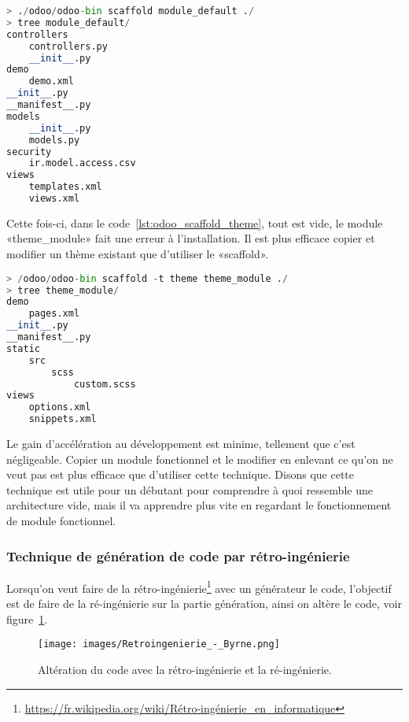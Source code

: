 \begin{lstlisting}[language=Python, upquote=true, caption={Commande Odoo pour générer un module avec le Scaffold}, label={lst:odoo_scaffold_default}]
> ./odoo/odoo-bin scaffold module_default ./
> tree module_default/
controllers
    controllers.py
    __init__.py
demo
    demo.xml
__init__.py
__manifest__.py
models
    __init__.py
    models.py
security
    ir.model.access.csv
views
    templates.xml
	views.xml
\end{lstlisting}

Cette fois-ci, dans le code~\ref{lst:odoo_scaffold_theme}, tout est vide, le module «theme\_module» fait une erreur à l'installation. Il est plus efficace copier et modifier un thème existant que d'utiliser le «scaffold».

\begin{lstlisting}[language=Python, upquote=true, caption={Commande Odoo pour générer un thème avec le Scaffold}, label={lst:odoo_scaffold_theme}]
> /odoo/odoo-bin scaffold -t theme theme_module ./
> tree theme_module/
demo
    pages.xml
__init__.py
__manifest__.py
static
    src
        scss
            custom.scss
views
    options.xml
    snippets.xml
\end{lstlisting}

Le gain d’accélération au développement est minime, tellement que c’est négligeable. Copier un module fonctionnel et le modifier en enlevant ce qu’on ne veut pas est plus efficace que d’utiliser cette technique. Disons que cette technique est utile pour un débutant pour comprendre à quoi ressemble une architecture vide, mais il va apprendre plus vite en regardant le fonctionnement de module fonctionnel.

\subsubsection{Technique de génération de code par rétro-ingénierie}

Lorsqu'on veut faire de la rétro-ingénierie\footnote{\url{https://fr.wikipedia.org/wiki/Rétro-ingénierie_en_informatique}} avec un générateur le code, l'objectif est de faire de la ré-ingénierie sur la partie génération, ainsi on altère le code, voir figure~\ref{fig:retro_re_ing}. %

\begin{figure}[htb]
\centering
\texttt{[image: images/Retroingenierie\_-\_Byrne.png]}
\caption{Altération du code avec la rétro-ingénierie et la ré-ingénierie.}
\label{fig:retro_re_ing}
\end{figure}

